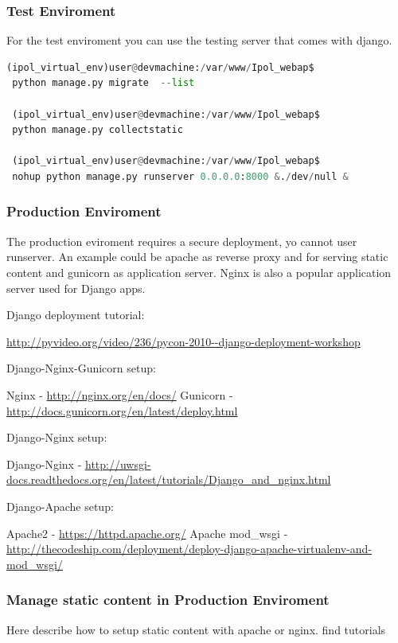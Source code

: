\subsubsection{Test Enviroment}
For the test enviroment you can use the testing server that comes with django.

\begin{lstlisting}[language=Python,firstnumber=1]
 (ipol_virtual_env)user@devmachine:/var/www/Ipol_webap$ 
 python manage.py migrate  --list
 
 (ipol_virtual_env)user@devmachine:/var/www/Ipol_webap$ 
 python manage.py collectstatic
 
 (ipol_virtual_env)user@devmachine:/var/www/Ipol_webap$ 
 nohup python manage.py runserver 0.0.0.0:8000 &./dev/null &
\end{lstlisting}


\subsubsection{Production Enviroment}
The production eviroment requires a secure deployment, yo cannot user runserver. An example could be apache as reverse proxy and for serving static content and gunicorn as application server. Nginx is also a popular application server used for Django apps.


Django deployment tutorial:

\url{http://pyvideo.org/video/236/pycon-2010--django-deployment-workshop}


Django-Nginx-Gunicorn setup:

Nginx - \url{http://nginx.org/en/docs/}
Gunicorn - \url{http://docs.gunicorn.org/en/latest/deploy.html}


Django-Nginx setup:

Django-Nginx - \url{http://uwsgi-docs.readthedocs.org/en/latest/tutorials/Django_and_nginx.html}


Django-Apache setup:

Apache2 - \url{https://httpd.apache.org/}
Apache mod\_wsgi - \url{http://thecodeship.com/deployment/deploy-django-apache-virtualenv-and-mod_wsgi/}



\subsubsection{Manage static content in Production Enviroment }
Here describe how to setup static content with apache or nginx. find tutorials

